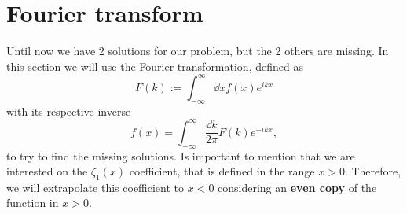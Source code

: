 \documentclass[%
 aip,
 jmp,%
 amsmath,amssymb,
 reprint,%
]{revtex4-2}
\begin{document}
%
%
%
%
\section{Fourier transform}

Until now we have 2 solutions for our problem, but the 2 others are missing. In this section we will use the Fourier transformation, defined as
\begin{equation}
   F(k) := \int_{-\infty}^{\infty}\dd{x}f(x)e^{ikx}
\end{equation}
with its respective inverse
\begin{equation}
   f(x) = \int_{-\infty}^{\infty}\frac{\dd{k}}{2\pi}F(k)e^{-ikx},
\end{equation}
to try to find the missing solutions. Is important to mention that we are interested on the $\zeta_1(x)$ coefficient, that is defined in the range $x>0$. Therefore, we will extrapolate this coefficient to $x<0$ considering an \textbf{even copy} of the function in $x>0$.
\end{document}
